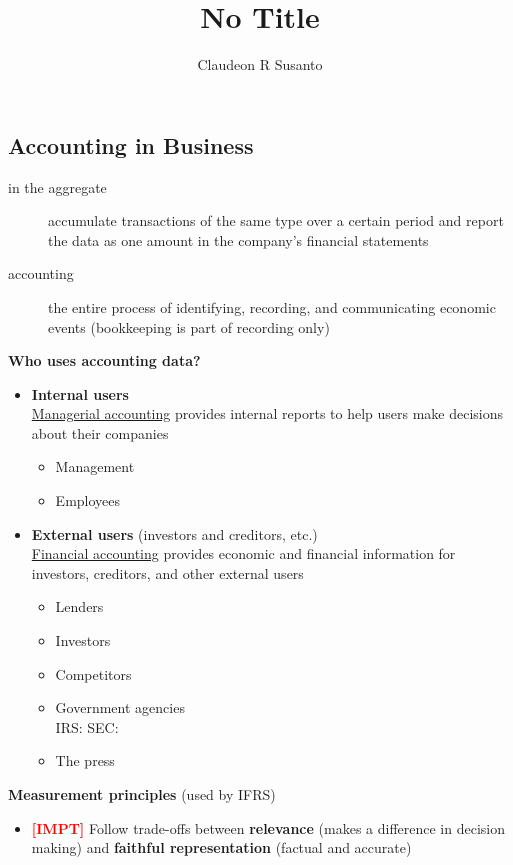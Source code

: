\documentclass{article}
\title{No Title}
\author{Claudeon R Susanto}
\date{}
\newcommand{\impt}[0]{\textcolor{red}{\textbf{[IMPT] }}}
\begin{document}
{}\selectfont
\begin{multicols}{2}
\section{Accounting in Business}
\begin{description}
	\item[in the aggregate] accumulate transactions of the same type over a certain period and report the data as one amount in the company's financial statements
	\item[accounting] the entire process of identifying, recording, and communicating economic events (bookkeeping is part of recording only)\\
\end{description}
\textbf{Who uses accounting data?}
\begin{itemize}[topsep=0pt]
	\item \textbf{Internal users}\\
	\underline{Managerial accounting} provides internal reports to help users make decisions about their companies
	\begin{itemize}
		\item Management
		\item Employees
	\end{itemize}
	\item \textbf{External users} (investors and creditors, etc.)\\
	\underline{Financial accounting} provides economic and financial information for investors, creditors, and other external users
	\begin{itemize}
		\item Lenders
		\item Investors
		\item Competitors
		\item Government agencies\\
		IRS:
		SEC:
		\item The press
	\end{itemize}
\end{itemize}
\textbf{Measurement principles} (used by IFRS)
\begin{itemize}
	\item \impt Follow trade-offs between \textbf{relevance} (makes a difference in decision making) and \textbf{faithful representation} (factual and accurate)

\end{itemize}
\end{multicols}
\end{document}
